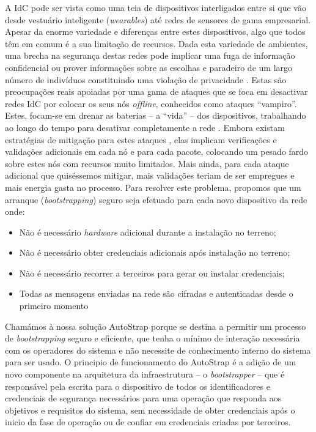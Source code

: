 \documentclass{llncs}
\begin{document}
A \ac{IdC} pode ser vista como uma teia de dispositivos interligados entre si que vão desde vestuário inteligente (\textit{wearables}) até redes de sensores de gama empresarial. Apesar da enorme variedade e diferenças entre estes dispositivos, algo que todos têm em comum é a sua limitação de recursos. Dada esta variedade de ambientes, uma brecha na segurança destas redes pode implicar uma fuga de informação confidencial ou prover informações sobre as escolhas e paradeiro de um largo número de indivíduos constituindo uma violação de privacidade \cite{Ukil2015}. Estas são preocupações reais apoiadas por uma gama de ataques que se foca em desactivar redes \ac{IdC} por colocar os seus nós \textit{offline}, conhecidos como  ataques ``vampiro''. Estes, focam-se em drenar as baterias -- a ``vida'' -- dos dispositivos, trabalhando ao longo do tempo para desativar completamente a rede \cite{Vasserman2013}\cite{Pongle2015}. Embora existam estratégias de mitigação para estes ataques \cite{Vasserman2013}, elas implicam verificações e validações adicionais em cada nó e para cada pacote, colocando um pesado fardo sobre estes nós com recursos muito limitados. Mais ainda, para cada ataque adicional que quiséssemos mitigar, mais validações teriam de ser empregues e mais energia gasta no processo.
Para resolver este problema, propomos que um arranque (\textit{bootstrapping}) seguro seja efetuado para cada novo dispositivo da rede onde:
\begin{itemize}
	\item{Não é necessário \textit{hardware} adicional durante a instalação no terreno};
	\item{Não é necessário obter credenciais adicionais após instalação no terreno};
	\item{Não é necessário recorrer a terceiros para gerar ou instalar credenciais};
	\item{Todas as mensagens enviadas na rede são cifradas e autenticadas desde o primeiro momento}
\end{itemize}
Chamámos à nossa solução AutoStrap porque se destina a permitir um processo de \textit{bootstrapping} seguro e eficiente, que tenha o mínimo de interação necessária com os operadores do sistema e não necessite de conhecimento interno do sistema para ser usado. 
O principio de funcionamento do AutoStrap é a adição de um novo componente na arquitetura da infraestrutura -- o \textit{bootstrapper} -- que é responsável pela escrita para o dispositivo de todos os identificadores e credenciais de segurança necessários para uma operação que responda aos objetivos e requisitos do sistema, sem necessidade de obter credenciais após o inicio da fase de operação ou de confiar em credenciais criadas por terceiros. 
\end{document}
